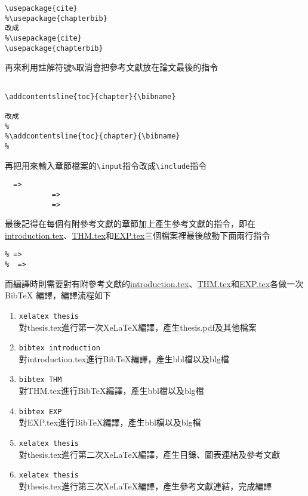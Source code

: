 \begin{acknowledgementsCH}
\begin{enumerate}[leftmargin=0pt, topsep=0pt, itemsep=0pt, label=\Roman{*}.]
    \begin{verbatim}
\usepackage{cite}
%\usepackage{chapterbib}
改成
%\usepackage{cite}
\usepackage{chapterbib}
    \end{verbatim}
    再來利用註解符號\texttt{\%}取消會把參考文獻放在論文最後的指令
    \begin{verbatim}

\addcontentsline{toc}{chapter}{\bibname}

改成
%
%\addcontentsline{toc}{chapter}{\bibname}
%
    \end{verbatim}
    再把用來輸入章節檔案的\texttt{\textbackslash input}指令改成\texttt{\textbackslash include}指令
     \begin{verbatim}
  =>  
           =>  
           =>  
     \end{verbatim}
    最後記得在每個有附參考文獻的章節加上產生參考文獻的指令，即在\href{run:./introduction.tex}{introduction.tex}、\href{run:./THM.tex}{THM.tex}和\href{run:./EXP.tex}{EXP.tex}三個檔案裡最後啟動下面兩行指令
     \begin{verbatim}
% => 
%  =>  
     \end{verbatim}
    而編譯時則需要對有附參考文獻的\href{run:./introduction.tex}{introduction.tex}、\href{run:./THM.tex}{THM.tex}和\href{run:./EXP.tex}{EXP.tex}各做一次BibTeX 編譯，編譯流程如下
    \begin{enumerate}[topsep=0pt, itemsep=0pt, label=\arabic{*}.]
    \item \texttt{xelatex thesis}\\ 對thesis.tex進行第一次XeLaTeX編譯，產生thesis.pdf及其他檔案
    \item \texttt{bibtex introduction}\\ 對introduction.tex進行BibTeX編譯，產生bbl檔以及blg檔
    \item \texttt{bibtex THM}\\ 對THM.tex進行BibTeX編譯，產生bbl檔以及blg檔
    \item \texttt{bibtex EXP}\\ 對EXP.tex進行BibTeX編譯，產生bbl檔以及blg檔
    \item \texttt{xelatex thesis}\\ 對thesis.tex進行第二次XeLaTeX編譯，產生目錄、圖表連結及參考文獻
    \item \texttt{xelatex thesis}\\ 對thesis.tex進行第三次XeLaTeX編譯，產生參考文獻連結，完成編譯\\

\end{enumerate}
\end{enumerate}
\end{acknowledgementsCH}
